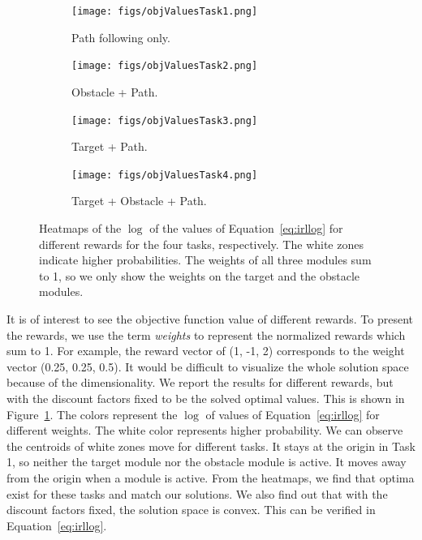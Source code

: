 \documentclass[12pt]{report}	%
\theoremstyle{definition}
\theoremstyle{remark}
\providecommand{\DIFaddbeginFL}{} %
\providecommand{\DIFaddendFL}{} %
\providecommand{\DIFdelbeginFL}{} %
\providecommand{\DIFdelendFL}{} %
\begin{document}
\begin{figure}
\centering
\DIFdelbeginFL %
\DIFdelendFL \DIFaddbeginFL \begin{subfigure}[b]{0.49\textwidth}
\DIFaddendFL \texttt{[image: figs/objValuesTask1.png]}
\caption{Path following only.}
\end{subfigure}
\DIFdelbeginFL %
\DIFdelendFL \DIFaddbeginFL \begin{subfigure}[b]{0.49\textwidth}
\DIFaddendFL \texttt{[image: figs/objValuesTask2.png]}
\caption{Obstacle + Path. }
\end{subfigure}
\DIFdelbeginFL %
\DIFdelendFL \DIFaddbeginFL \begin{subfigure}[b]{0.49\textwidth}
\DIFaddendFL \texttt{[image: figs/objValuesTask3.png]}
\caption{Target + Path. }
\end{subfigure}
\DIFdelbeginFL %
\DIFdelendFL \DIFaddbeginFL \begin{subfigure}[b]{0.49\textwidth}
\DIFaddendFL \texttt{[image: figs/objValuesTask4.png]}
\caption{Target + Obstacle + Path. }
\end{subfigure}
\caption{Heatmaps of the $\log$ of the values of Equation~\ref{eq:irllog} for
different rewards for the four tasks, respectively. The white zones indicate
higher probabilities. The weights of all three modules sum to 1, so we only show
the weights on the target and the obstacle modules.
}
\label{fig:heatmap}
\end{figure}

It is of interest to see the objective function value of different rewards. To
present the rewards, we use the term \textit{weights} to represent the
normalized rewards which sum to 1. For example, the reward vector of (1, -1, 2)
corresponds to the weight vector (0.25, 0.25, 0.5). It would be difficult to
visualize the whole solution space because of the dimensionality. We report the
results for different rewards, but with the discount factors fixed to be the solved optimal
values.
This is shown in Figure~\ref{fig:heatmap}. The colors represent the $\log$ of values of
Equation~\ref{eq:irllog} for different weights. The white color represents higher
probability. We can observe the centroids of white zones move for different
tasks. It stays at the origin in Task 1, so neither the target module nor the
obstacle module is active. It moves away from the origin when a module is
active.  From the heatmaps, we find that optima exist for these tasks and match
our solutions. We also find out that with the discount factors fixed, the
solution space is convex. This can be verified in Equation~\ref{eq:irllog}.
\end{document}

